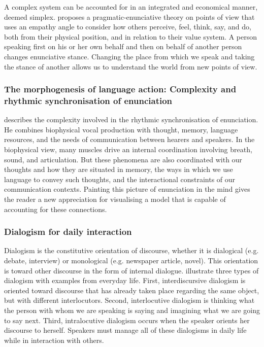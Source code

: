 \documentclass[output=paper]{langscibook}
\begin{document}
A complex system can be accounted for in an integrated and economical manner, deemed simplex.  proposes a pragmatic-enunciative theory on points of view that uses an empathy angle to consider how others perceive, feel, think, say, and do, both from their physical position, and in relation to their value system. A person speaking first on his or her own behalf and then on behalf of another person changes enunciative stance. Changing the place from which we speak and taking the stance of another allows us to understand the world from new points of view.

\subsubsection{The morphogenesis of language action: Complexity and rhythmic synchronisation of enunciation}

 describes the complexity involved in the rhythmic synchronisation of enunciation. He combines biophysical vocal production with thought, memory, language resources, and the needs of communication between hearers and speakers. In the biophysical view, many muscles drive an internal coordination involving breath, sound, and articulation. But these phenomena are also coordinated with our thoughts and how they are situated in memory, the ways in which we use language to convey such thoughts, and the interactional constraints of our communication contexts. Painting this picture of enunciation in the mind gives the reader a new appreciation for visualising a model that is capable of accounting for these connections.

\subsubsection{Dialogism for daily interaction}

Dialogism is the constitutive orientation of discourse, whether it is dialogical (e.g. debate, interview) or monological (e.g. newspaper article, novel). This orientation is toward other discourse in the form of internal dialogue.  illustrate three types of dialogism with examples from everyday life. First, interdiscursive dialogism is oriented toward discourse that has already taken place regarding the same object, but with different interlocutors. Second, interlocutive dialogism is thinking what the person with whom we are speaking is saying and imagining what we are going to say next. Third, intralocutive dialogism occurs when the speaker orients her discourse to herself. Speakers must manage all of these dialogisms in daily life while in interaction with others.
\end{document}
